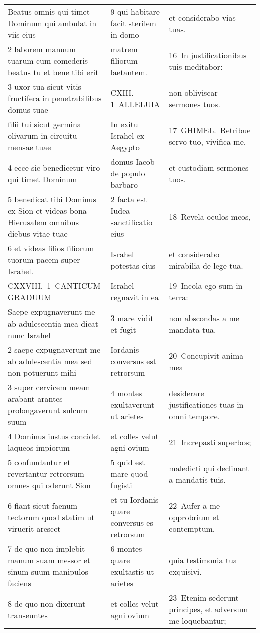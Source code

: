 \documentclass{article}
\begin{document}
\begin{longtable}{@{}p{}p{}p{}@{}}
Beatus omnis qui timet Dominum qui ambulat in viis eius	&	9 qui habitare facit sterilem in domo	&	et considerabo vias tuas.	\\
2 laborem manuum tuarum cum comederis beatus tu et bene tibi erit	&	matrem filiorum laetantem.	&	16 In justificationibus tuis meditabor:	\\
3 uxor tua sicut vitis fructifera in penetrabilibus domus tuae	&	CXIII. 1 ALLELUIA	&	non obliviscar sermones tuos.	\\
filii tui sicut germina olivarum in circuitu mensae tuae	&	In exitu Israhel ex Aegypto	&	17 GHIMEL. Retribue servo tuo, vivifica me,	\\
4 ecce sic benedicetur viro qui timet Dominum	&	domus Iacob de populo barbaro	&	et custodiam sermones tuos.	\\
5 benedicat tibi Dominus ex Sion et videas bona Hierusalem omnibus diebus vitae tuae	&	2 facta est Iudea sanctificatio eius	&	18 Revela oculos meos,	\\
6 et videas filios filiorum tuorum pacem super Israhel.	&	Israhel potestas eius	&	et considerabo mirabilia de lege tua.	\\
CXXVIII. 1 CANTICUM GRADUUM	&	Israhel regnavit in ea	&	19 Incola ego sum in terra:	\\
Saepe expugnaverunt me ab adulescentia mea dicat nunc Israhel	&	3 mare vidit et fugit	&	non abscondas a me mandata tua.	\\
2 saepe expugnaverunt me ab adulescentia mea sed non potuerunt mihi	&	Iordanis conversus est retrorsum	&	20 Concupivit anima mea	\\
3 super cervicem meam arabant arantes prolongaverunt sulcum suum	&	4 montes exultaverunt ut arietes	&	desiderare justificationes tuas in omni tempore.	\\
4 Dominus iustus concidet laqueos impiorum	&	et colles velut agni ovium	&	21 Increpasti superbos;	\\
5 confundantur et revertantur retrorsum omnes qui oderunt Sion	&	5 quid est mare quod fugisti	&	maledicti qui declinant a mandatis tuis.	\\
6 fiant sicut faenum tectorum quod statim ut viruerit arescet	&	et tu Iordanis quare conversus es retrorsum	&	22 Aufer a me opprobrium et contemptum,	\\
7 de quo non implebit manum suam messor et sinum suum manipulos faciens	&	6 montes quare exultastis ut arietes	&	quia testimonia tua exquisivi.	\\
8 de quo non dixerunt transeuntes	&	et colles velut agni ovium	&	23 Etenim sederunt principes, et adversum me loquebantur;	\\

\end{longtable}
\end{document}

